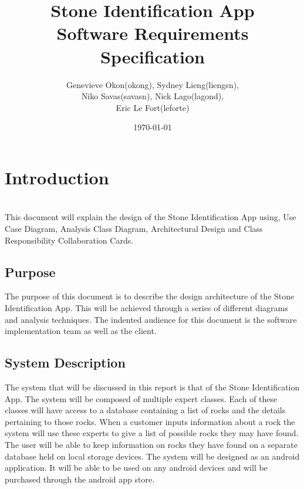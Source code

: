 \documentclass[titlepage]{article}
\title{Stone Identification App \\
Software Requirements Specification}
\author{Genevieve Okon(okong), Sydney Lieng(liengsn),\\
Niko Savas(savasn), Nick Lago(lagond),\\
Eric Le Fort(leforte)}
\date{\today}
\begin{document}
\maketitle
\newpage

\section{Introduction}~\\
This document will explain the design of the Stone Identification App using, Use Case Diagram, Analysis Class Diagram, Architectural Design and Class Responsibility Collaboration Cards. 

\subsection{Purpose}{
The purpose of this document is to describe the design architecture of the Stone Identification App. This will be achieved through a series of different diagrams and analysis techniques. The indented audience for this document is the software implementation team as well as the client.
}

\subsection{System Description}{
The system that will be discussed in this report is that of the Stone Identification App. The system will be composed of multiple expert classes. Each of these classes will have access to a database containing a list of rocks and the details pertaining to those rocks. When a customer inputs information about a rock the system will use these experts to give a list of possible rocks they may have found. The user will be able to keep information on rocks they have found on a separate database held on local storage devices. The system will be designed as an android application. It will be able to be used on any android devices and will be purchased through the android app store. 
}
\end{document}
